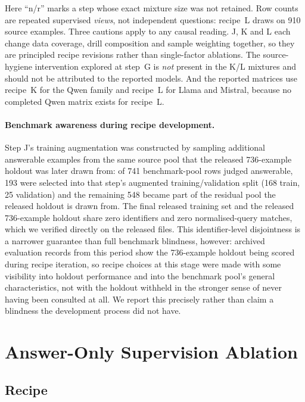 Here ``n/r'' marks a step whose exact mixture size was not retained. Row counts
are repeated supervised \emph{views}, not independent questions:
recipe~L draws on 910 source examples. Three cautions apply to any causal
reading. J, K and L each change data coverage, drill composition and sample
weighting together, so they are principled recipe revisions rather than
single-factor ablations. The source-hygiene intervention explored at step~G is
\emph{not} present in the K/L mixtures and should not be attributed to the
reported models. And the reported matrices use recipe~K for the Qwen family and
recipe~L for Llama and Mistral, because no completed Qwen matrix exists for
recipe~L.

\paragraph{Benchmark awareness during recipe development.} Step J's training
augmentation was constructed by sampling additional answerable examples from
the same source pool that the released 736-example holdout was later drawn
from: of 741 benchmark-pool rows judged answerable, 193 were selected into
that step's augmented training/validation split (168 train, 25 validation)
and the remaining 548 became part of the residual pool the released holdout
is drawn from. The final released training set and the released 736-example
holdout share zero identifiers and zero normalised-query matches, which we
verified directly on the released files. This identifier-level disjointness
is a narrower guarantee than full benchmark blindness, however: archived
evaluation records from this period show the 736-example holdout being
scored during recipe iteration, so recipe choices at this stage were made
with some visibility into holdout performance and into the benchmark pool's
general characteristics, not with the holdout withheld in the stronger sense
of never having been consulted at all. We report this precisely rather than
claim a blindness the development process did not have.

\section{Answer-Only Supervision Ablation}
\label{app:answeronly}

\subsection{Recipe}

